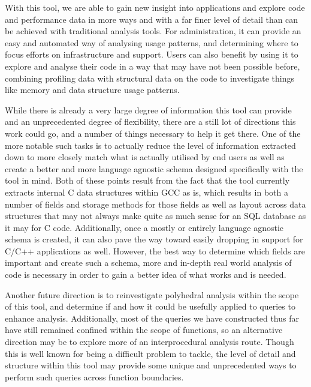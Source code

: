 With this tool, we are able to gain new insight into applications and explore code and performance data in more ways and with a far finer level of detail than can be achieved with traditional analysis tools.
For administration, it can provide an easy and automated way of analysing usage patterns, and determining where to focus efforts on infrastructure and support.
Users can also benefit by using it to explore and analyse their code in a way that may have not been possible before, combining profiling data with structural data on the code to investigate things like memory and data structure usage patterns.

While there is already a very large degree of information this tool can provide and an unprecedented degree of flexibility, there are a still lot of directions this work could go, and a number of things necessary to help it get there.
One of the more notable such tasks is to actually reduce the level of information extracted down to more closely match what is actually utilised by end users as well as create a better and more language agnostic schema designed specifically with the tool in mind.
Both of these points result from the fact that the tool currently extracts internal C data structures within \acs{GCC} as is, which results in both a number of fields and storage methods for those fields as well as layout across data structures that may not always make quite as much sense for an \acs{SQL} database as it may for C code.
Additionally, once a mostly or entirely language agnostic schema is created, it can also pave the way toward easily dropping in support for C/C++ applications as well.
However, the best way to determine which fields are important and create such a schema, more and in-depth real world analysis of code is necessary in order to gain a better idea of what works and is needed.

Another future direction is to reinvestigate polyhedral analysis within the scope of this tool, and determine if and how it could be usefully applied to queries to enhance analysis.
Additionally, most of the queries we have constructed thus far have still remained confined within the scope of functions, so an alternative direction may be to explore more of an interprocedural analysis route.
Though this is well known for being a difficult problem to tackle, the level of detail and structure within this tool may provide some unique and unprecedented ways to perform such queries across function boundaries.
